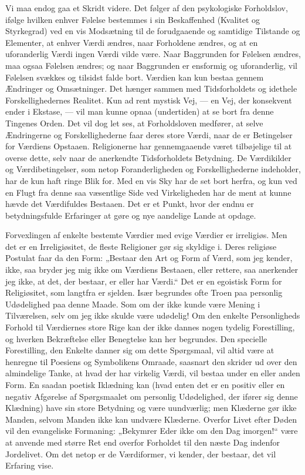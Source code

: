 \documentclass[12pt,a4paper,openany]{book}
\newcommand{\opage}[1]{\marginnote{\footnotesize\textit{[#1]}}}
\begin{document}
Vi maa endog gaa et Skridt videre. Det følger af den psykologiske
Forholdslov, ifølge hvilken enhver Følelse bestemmes i sin Beskaffenhed
(Kvalitet og Styrkegrad) ved en vis Modsætning til de forudgaaende og
samtidige Tilstande og Elementer, at enhver Værdi ændres, naar
Forholdene ændres, og at en uforanderlig Værdi ingen Værdi vilde være.
Naar Baggrunden for Følelsen ændres, maa ogsaa Følelsen ændres; og naar
Baggrunden er ensformig og uforanderlig, vil Følelsen svækkes og
tilsidst falde bort. Værdien kan kun bestaa gennem Ændringer og
Omsætninger. Det hænger sammen med Tidsforholdets og idethele
Forskellighedernes Realitet. Kun ad rent mystisk Vej, --- en Vej, der
konsekvent ender i Ekstase, --- vil man kunne opnaa (undertiden) at se
bort fra denne Tingenes Orden. Det vil dog let ses, at Forholdsloven
medfører, at selve Ændringerne og Forskellighederne faar deres store
Værdi, naar de er Betingelser for Værdiens Opstaaen. Religionerne har
gennemgaaende været tilbøjelige til at overse dette, selv naar de
anerkendte Tidsforholdets Betydning. De Værdikilder og Værdibetingelser,
som netop Foranderligheden og Forskellighederne indeholder, har de kun
haft
\opage{176}ringe Blik for. Med en vis Sky har de set bort herfra, og kun
ved en Flugt fra denne saa væsentlige Side ved Virkeligheden har de ment
at kunne hævde det Værdifuldes Bestaaen. Det er et Punkt, hvor der endnu
er betydningsfulde Erfaringer at gøre og nye aandelige Lande at opdage.

Forvexlingen af enkelte bestemte Værdier med evige Værdier er
irreligiøs. Men det er en Irreligiøsitet, de fleste Religioner gør sig
skyldige i. Deres religiøse Postulat faar da den Form: „Bestaar den Art
og Form af Værd, som jeg kender, ikke, saa bryder jeg mig ikke om
Værdiens Bestaaen, eller rettere, saa anerkender jeg ikke, at det, der
bestaar, er eller har Værdi.“ Det er en egoistisk Form for Religiøsitet,
som langtfra er sjelden. Især begrundes ofte Troen paa personlig
Udødelighed paa denne Maade. Som om der ikke kunde være Mening i
Tilværelsen, selv om jeg ikke skulde være udødelig! Om den enkelte
Personligheds Forhold til Værdiernes store Rige kan der ikke dannes
nogen tydelig Forestilling, og hverken Bekræftelse eller Benegtelse kan
her begrundes. Den specielle Forestilling, den Enkelte danner sig om
dette Spørgsmaal, vil altid være at henregne til Poesiens og Symbolikens
Omraade, saasnart den skrider ud over den almindelige Tanke, at hvad der
har virkelig Værdi, vil bestaa under en eller anden Form. En saadan
poetisk Iklædning kan (hvad enten det er en positiv eller en negativ
Afgørelse af Spørgsmaalet om personlig Udødelighed, der ifører sig denne
Klædning) have sin store Betydning og være uundværlig; men Klæderne gør
ikke Manden, selvom Manden ikke kan undvære Klæderne. Overfor Livet
efter Døden vil den evangeliske Formaning: „Bekymrer Eder ikke om den
Dag imorgen!“ være at anvende med større Ret end overfor Forholdet til
den næste Dag indenfor Jordelivet. Om det netop er de Værdiformer, vi
kender, der bestaar, det vil Erfaring vise.
\end{document}
